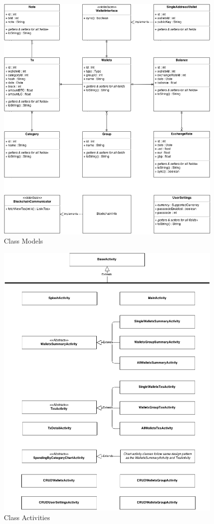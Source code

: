 \begin{figure}[H]
	\centering
	\includegraphics[scale=0.5]{../diagrams/classes_Model.png}
	\caption{Class Models}
\end{figure}


\begin{figure}[H]
	\centering
	\includegraphics[scale=0.5]{../diagrams/classes_Activity.png}
	\caption{Class Activities}
\end{figure}

